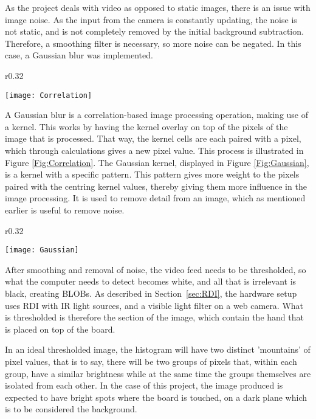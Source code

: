 As the project deals with video as opposed to static images, there is an issue with image noise. As the input from the camera is constantly updating, the noise is not static, and is not completely removed by the initial background subtraction. Therefore, a smoothing filter is necessary, so more noise can be negated. In this case, a Gaussian blur was implemented.

\begin{wrapfigure}{r}{0.32\textwidth}
  \begin{center}
    \texttt{[image: Correlation]}
  \end{center}
  \caption{A visualisation of correlation \label{Fig:Correlation}\citep{moeslund_introduction_2012}}
\end{wrapfigure}

A Gaussian blur is a correlation-based image processing operation, making use of a kernel. This works by having the kernel overlay on top of the pixels of the image that is processed. That way, the kernel cells are each paired with a pixel, which through calculations gives a new pixel value. This process is illustrated in Figure \ref{Fig:Correlation}. The Gaussian kernel, displayed in Figure \ref{Fig:Gaussian}, is a kernel with a specific pattern. This pattern gives more weight to the pixels paired with the centring kernel values, thereby giving them more influence in the image processing. It is used to remove detail from an image, which as mentioned earlier is useful to remove noise.

\begin{wrapfigure}{r}{0.32\textwidth}
\begin{center}
 \texttt{[image: Gaussian]}
  \end{center}
\caption{A 5x5 Gaussian kernel pattern \label{Fig:Gaussian}\citep{moeslund_introduction_2012}}
\end{wrapfigure}

After smoothing and removal of noise, the video feed needs to be thresholded, so what the computer needs to detect becomes white, and all that is irrelevant is black, creating BLOBs. As described in Section~\ref{sec:RDI}, the hardware setup uses RDI with IR light sources, and a visible light filter on a web camera. What is thresholded is therefore the section of the image, which contain the hand that is placed on top of the board.
 
In an ideal thresholded image, the histogram will have two distinct 'mountains' of pixel values, that is to say, there will be two groups of pixels that, within each group, have a similar brightness while at the same time the groups themselves are isolated from each other. In the case of this project, the image produced is expected to have bright spots where the board is touched, on a dark plane which is to be considered the background.
 
